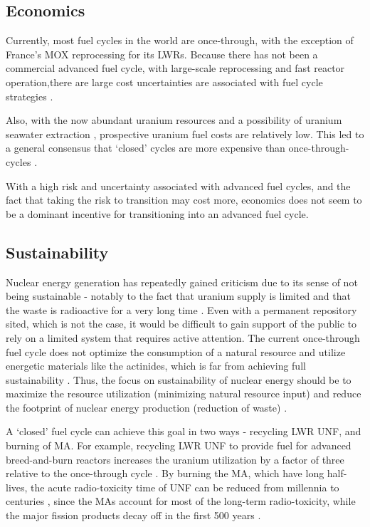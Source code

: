 \subsection{Economics}
Currently, most fuel cycles in the world are once-through,
with the exception of France's \gls{MOX} reprocessing for its
\glspl{LWR}. Because there has not been a commercial advanced
fuel cycle, with large-scale reprocessing and fast reactor
operation,there are large cost uncertainties are associated
with fuel cycle strategies \cite{d._e._shropshire_advanced_2009}.

Also, with the now abundant uranium resources and a possibility
of uranium seawater extraction \cite{tabushi_extraction_1979},
prospective uranium fuel costs are relatively
low. This led to a general consensus that `closed' cycles are
more expensive than once-through-cycles
\cite{d._e._shropshire_advanced_2009, bunn_economics_2005, charpin_economic_2000}.

With a high risk and uncertainty associated with advanced fuel cycles,
and the fact that taking the risk to transition may cost more,
economics does not seem to be a dominant incentive for transitioning
into an advanced fuel cycle.

\subsection{Sustainability}
Nuclear energy generation has repeatedly gained criticism due to its
sense of not being sustainable - notably to the fact that uranium
supply is limited and that the waste is radioactive
for a very long time \cite{dittmar_nuclear_2012}. Even with a permanent repository sited,
which is not the case, it would be difficult to gain support of the
public to rely on a limited system that requires active attention.
 The current once-through
fuel cycle does not optimize the consumption of a natural resource
and utilize energetic materials like the actinides, which is far
from achieving full sustainability \cite{poinssot_recycling_2012}.
Thus, the focus on sustainability of nuclear energy should be
to maximize the resource utilization (minimizing natural resource
input) and reduce the footprint of nuclear energy production
(reduction of waste) \cite{poinssot_assessment_2014}.

A `closed' fuel cycle can achieve this goal in two ways -
recycling \gls{LWR} \gls{UNF}, and burning of \gls{MA}.
For example, recycling \gls{LWR} \gls{UNF} to provide
fuel for advanced breed-and-burn reactors increases
the uranium utilization by a factor of three relative
to the once-through cycle \cite{zhang_improved_2018}.
By burning the \gls{MA}, which have long half-lives,
the acute radio-toxicity time of \gls{UNF} can be reduced
from millennia to centuries \cite{nash_1-_2015}, since the
\glspl{MA} account for most of the long-term radio-toxicity,
while the major fission products decay off in the first 500
years \cite{hardin_thermal_2011}.

